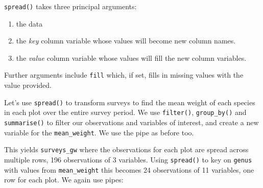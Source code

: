 \documentclass[]{book}
\newenvironment{Shaded}{\begin{snugshade}}{\end{snugshade}}
\newcommand{\KeywordTok}[1]{\textcolor[rgb]{0.13,0.29,0.53}{\textbf{#1}}}
\newcommand{\DataTypeTok}[1]{\textcolor[rgb]{0.13,0.29,0.53}{#1}}
\newcommand{\StringTok}[1]{\textcolor[rgb]{0.31,0.60,0.02}{#1}}
\newcommand{\OperatorTok}[1]{\textcolor[rgb]{0.81,0.36,0.00}{\textbf{#1}}}
\newcommand{\NormalTok}[1]{#1}
\providecommand{\tightlist}{%
  \setlength{\itemsep}{0pt}\setlength{\parskip}{0pt}}
\begin{document}
\texttt{spread()} takes three principal arguments:

\begin{enumerate}
\def\labelenumi{\arabic{enumi}.}
\tightlist
\item
  the data
\item
  the \emph{key} column variable whose values will become new column
  names.\\
\item
  the \emph{value} column variable whose values will fill the new column
  variables.
\end{enumerate}

Further arguments include \texttt{fill} which, if set, fills in missing
values with the value provided.

Let's use \texttt{spread()} to transform surveys to find the mean weight
of each species in each plot over the entire survey period. We use
\texttt{filter()}, \texttt{group\_by()} and \texttt{summarise()} to
filter our observations and variables of interest, and create a new
variable for the \texttt{mean\_weight}. We use the pipe as before too.

\begin{Shaded}
\end{Shaded}

This yields \texttt{surveys\_gw} where the observations for each plot
are spread across multiple rows, 196 observations of 3 variables. Using
\texttt{spread()} to key on \texttt{genus} with values from
\texttt{mean\_weight} this becomes 24 observations of 11 variables, one
row for each plot. We again use pipes:

\begin{Shaded}
\end{Shaded}
\end{document}
